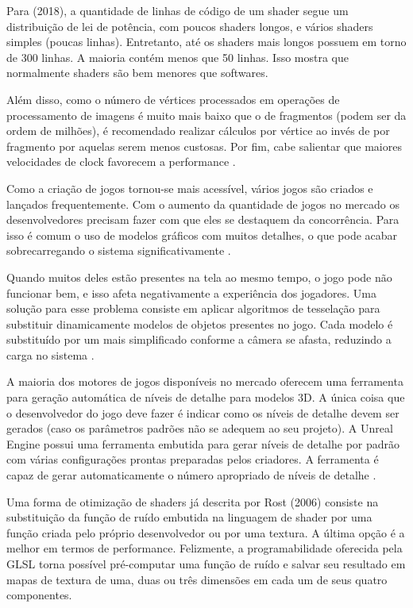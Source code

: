 

Para  (2018), a quantidade de linhas de código de um shader segue um distribuição de lei de potência, com poucos shaders longos, e vários shaders simples (poucas linhas). Entretanto, até os shaders mais longos possuem em torno de 300 linhas. A maioria contém menos que 50 linhas. Isso mostra que normalmente shaders são bem menores que softwares.

Além disso, como o número de vértices processados em operações de processamento de imagens é muito mais baixo que o de fragmentos (podem ser da ordem de milhões), é recomendado realizar cálculos por vértice ao invés de por fragmento por aquelas serem menos custosas. Por fim, cabe salientar que maiores velocidades de clock favorecem a performance \cite{optimizationMobile}.

Como a criação de jogos tornou-se mais acessível, vários jogos são criados e lançados frequentemente. Com o aumento da quantidade de jogos no mercado os desenvolvedores precisam fazer com que eles se destaquem da concorrência. Para isso é comum o uso de modelos gráficos com muitos detalhes, o que pode acabar sobrecarregando o sistema significativamente \cite{performanceTesselation}. 

Quando muitos deles estão presentes na tela ao mesmo tempo, o jogo pode não funcionar bem, e isso afeta negativamente a experiência dos jogadores. Uma solução para esse problema consiste em aplicar algoritmos de tesselação para substituir dinamicamente modelos de objetos presentes no jogo. Cada modelo é substituído por um mais simplificado conforme a câmera se afasta, reduzindo a carga no sistema \cite{performanceTesselation}.

A maioria dos motores de jogos disponíveis no mercado oferecem uma ferramenta para geração automática de níveis de detalhe para modelos 3D. A única coisa que o desenvolvedor do jogo deve fazer é indicar como os níveis de detalhe devem ser gerados (caso os parâmetros padrões não se adequem ao seu projeto). A Unreal Engine possui uma ferramenta embutida para gerar níveis de detalhe por padrão com várias configurações prontas preparadas pelos criadores. A ferramenta é capaz de gerar automaticamente o número apropriado de níveis de detalhe \cite{performanceTesselation}.

Uma forma de otimização de shaders já descrita por Rost (2006) consiste na substituição da função de ruído embutida na linguagem de shader por uma função criada pelo próprio desenvolvedor ou por uma textura. A última opção é a melhor em termos de performance. Felizmente, a programabilidade oferecida pela GLSL torna possível pré-computar uma função de ruído e salvar seu resultado em mapas de textura de uma, duas ou três dimensões em cada um de seus quatro componentes.

